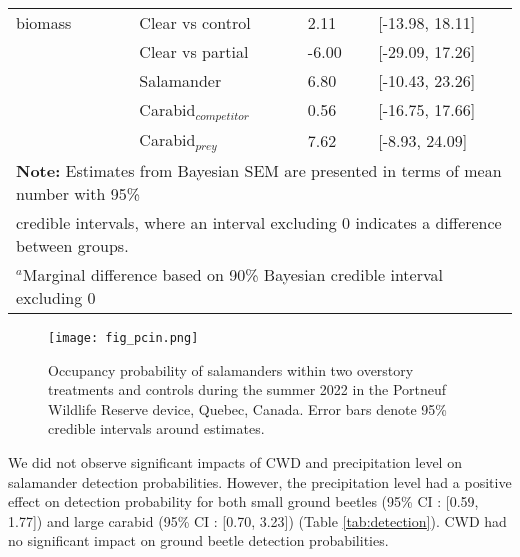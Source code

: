 \begin{table}[ht]
\begin{tabular}{lllll}
      biomass             && Clear vs control  & \hspace{1mm}2.11 & [-13.98, 18.11] \\ 
                          && Clear vs partial  & -6.00 & [-29.09, 17.26] \\  
                          && Salamander        & \hspace{1mm}6.80 & [-10.43, 23.26] \\ 
                          && Carabid$_{competitor}$      & \hspace{1mm}0.56 & [-16.75, 17.66] \\ 
                          && Carabid$_{prey}$      & \hspace{1mm}7.62 & [-8.93, 24.09] \\ 
      \hline
      \multicolumn{5}{l}{\textbf{Note:} Estimates from Bayesian SEM are presented in terms of mean number with 95\%} \\
      \multicolumn{5}{l}{credible intervals, where an interval excluding 0 indicates a difference between groups.} \\
      \multicolumn{5}{l}{$^{a}$Marginal difference based on 90\% Bayesian credible interval excluding 0}
  \end{tabular}
\end{table}


\clearpage

\begin{figure}[ht]
  \centering
  \texttt{[image: fig\_pcin.png]}
  \caption[Occupancy probability of salamanders under overstory treatments]
  {Occupancy probability of salamanders within two overstory treatments and controls during the summer 2022 in the Portneuf Wildlife Reserve device, Quebec, Canada. 
  Error bars denote 95\% credible intervals around estimates.}
  \label{fig:pcin}
\end{figure}

\vspace{10pt}

We did not observe significant impacts of CWD and precipitation level on salamander detection probabilities. 
However, the precipitation level had a positive effect on detection probability for both small ground beetles (95\% CI : [0.59, 1.77]) and large carabid (95\% CI : [0.70, 3.23]) (Table \ref{tab:detection}). 
CWD had no significant impact on ground beetle detection probabilities.


